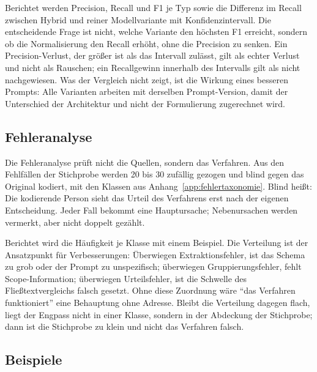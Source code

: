 Berichtet werden Precision, Recall und F1 je Typ sowie die Differenz im Recall zwischen
Hybrid und reiner Modellvariante mit Konfidenzintervall. Die entscheidende Frage ist nicht,
welche Variante den höchsten F1 erreicht, sondern ob die Normalisierung den Recall erhöht,
ohne die Precision zu senken. Ein Precision-Verlust, der größer ist als das Intervall
zulässt, gilt als echter Verlust und nicht als Rauschen; ein Recallgewinn innerhalb des
Intervalls gilt als nicht nachgewiesen. Was der Vergleich nicht zeigt, ist die Wirkung eines
besseren Prompts: Alle Varianten arbeiten mit derselben Prompt-Version, damit der Unterschied
der Architektur und nicht der Formulierung zugerechnet wird.


\subsection{Fehleranalyse}

Die Fehleranalyse prüft nicht die Quellen, sondern das Verfahren. Aus den Fehlfällen der
Stichprobe werden 20 bis 30 zufällig gezogen und blind gegen das Original kodiert, mit den
Klassen aus Anhang~\ref{app:fehlertaxonomie}. Blind heißt: Die kodierende Person sieht das
Urteil des Verfahrens erst nach der eigenen Entscheidung. Jeder Fall bekommt eine
Hauptursache; Nebenursachen werden vermerkt, aber nicht doppelt gezählt.

Berichtet wird die Häufigkeit je Klasse mit einem Beispiel. Die Verteilung ist der Ansatzpunkt
für Verbesserungen: Überwiegen Extraktionsfehler, ist das Schema zu grob oder der Prompt zu
unspezifisch; überwiegen Gruppierungsfehler, fehlt Scope-Information; überwiegen
Urteilsfehler, ist die Schwelle des Fließtextvergleichs falsch gesetzt. Ohne diese Zuordnung
wäre \enquote{das Verfahren funktioniert} eine Behauptung ohne Adresse. Bleibt die Verteilung
dagegen flach, liegt der Engpass nicht in einer Klasse, sondern in der Abdeckung der
Stichprobe; dann ist die Stichprobe zu klein und nicht das Verfahren falsch.


\subsection{Beispiele}

